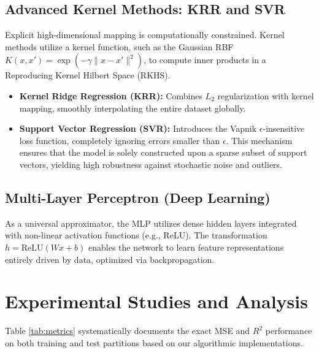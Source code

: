 \documentclass[12pt,a4paper]{article}
\begin{document}
\subsection{Advanced Kernel Methods: KRR and SVR}
Explicit high-dimensional mapping is computationally constrained. Kernel methods utilize a kernel function, such as the Gaussian RBF $K(x, x') = \exp(-\gamma \|x - x'\|^2)$, to compute inner products in a Reproducing Kernel Hilbert Space (RKHS).
\begin{itemize}
    \item \textbf{Kernel Ridge Regression (KRR):} Combines $L_2$ regularization with kernel mapping, smoothly interpolating the entire dataset globally.
    \item \textbf{Support Vector Regression (SVR):} Introduces the Vapnik $\epsilon$-insensitive loss function, completely ignoring errors smaller than $\epsilon$. This mechanism ensures that the model is solely constructed upon a sparse subset of support vectors, yielding high robustness against stochastic noise and outliers.
\end{itemize}

\subsection{Multi-Layer Perceptron (Deep Learning)}
As a universal approximator, the MLP utilizes dense hidden layers integrated with non-linear activation functions (e.g., ReLU). The transformation $h = \text{ReLU}(W x + b)$ enables the network to learn feature representations entirely driven by data, optimized via backpropagation.

\section{Experimental Studies and Analysis}

Table \ref{tab:metrics} systematically documents the exact MSE and $R^2$ performance on both training and test partitions based on our algorithmic implementations. 
\end{document}
